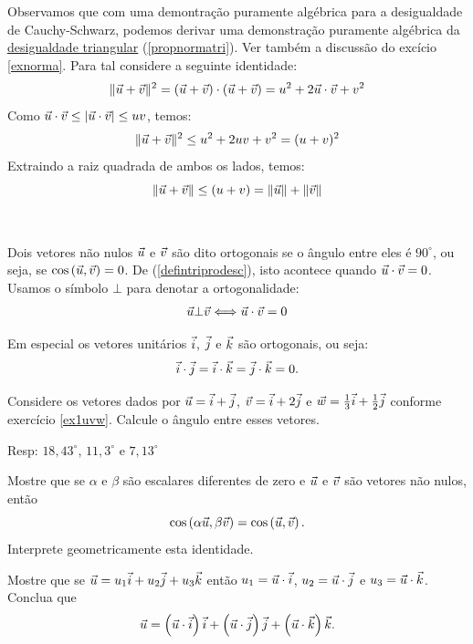 Observamos que com uma demontração puramente algébrica para a desigualdade de Cauchy-Schwarz, podemos derivar uma demonstração puramente algébrica da \underline{desigualdade triangular} (\ref{propnormatri}). Ver também a discussão do excício \ref{exnorma}. Para tal considere a seguinte identidade:
$$\|\vec{u}+\vec{v}\|^2=\left(\vec{u}+\vec{v}\right)\cdot \left(\vec{u}+\vec{v}\right) = u^2+2\vec{u}\cdot\vec{v}+v^2$$
Como $\vec{u}\cdot\vec{v}\leq |\vec{u}\cdot\vec{v}|\leq uv$, temos:
$$\|\vec{u}+\vec{v}\|^2\leq u^2+2uv+v^2=(u+v)^2$$
Extraindo a raiz quadrada de ambos os lados, temos:
$$\|\vec{u}+\vec{v}\|\leq (u+v)=\|\vec{u}\|+\|\vec{v}\|$$
\\~\\
Dois vetores não nulos $\vec{u}$ e $\vec{v}$ são dito ortogonais se o ângulo entre eles é $90^\circ$, ou seja, se $\cos\left(\vec{u},\vec{v}\right)=0$. De (\ref{defintriprodesc}), isto acontece quando $\vec{u}\cdot\vec{v}=0$. Usamos o símbolo $\bot$ para denotar a ortogonalidade:
\begin{eqnarray}\vec{u}\bot \vec{v}\Longleftrightarrow \vec{u}\cdot\vec{v}=0\label{deforto}
\end{eqnarray}

Em especial os vetores unitários $\vec{i}$, $\vec{j}$ e $\vec{k}$ são ortogonais, ou seja: $$\vec{i}\cdot \vec{j}=\vec{i}\cdot \vec{k}=\vec{j}\cdot \vec{k}=0.$$

\begin{exer} Considere os vetores dados por $\vec{u}=\vec{i}+\vec{j}$, $\vec{v}=\vec{i}+2\vec{j}$ e $\vec{w}=\frac{1}{3}\vec{i}+\frac{1}{2}\vec{j}$ conforme exercício \ref{ex1uvw}. Calcule o ângulo entre esses vetores.  
\end{exer}
Resp: $18,43^\circ$, $11,3^\circ$ e  $7,13^\circ$
\begin{exer} Mostre que se $\alpha$ e $\beta$ são escalares diferentes de zero e $\vec{u}$ e $\vec{v}$ são vetores não nulos, então $$\cos\left(\alpha\vec{u},\beta\vec{v}\right)=\cos\left(\vec{u},\vec{v}\right).$$
Interprete geometricamente esta identidade.
\end{exer}


\begin{exer}Mostre que se $\vec{u}=u_1\vec{i}+u_2\vec{j}+u_3\vec{k}$ então $u_1=\vec{u}\cdot\vec{i}$, $u_2=\vec{u}\cdot\vec{j}$ e $u_3=\vec{u}\cdot\vec{k}$. Conclua que
$$\vec{u}=\left(\vec{u}\cdot\vec{i}\right) \vec{i}+\left(\vec{u}\cdot\vec{j}\right) \vec{j}+\left(\vec{u}\cdot\vec{k}\right) \vec{k}.$$

\end{exer}

